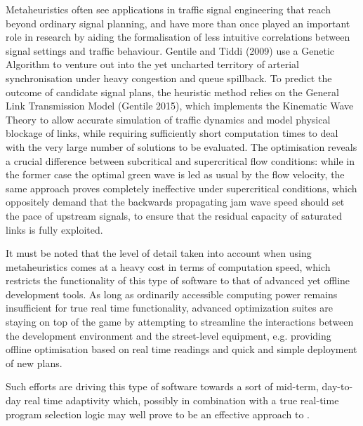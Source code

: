 Metaheuristics often see applications in traffic signal engineering that reach beyond ordinary signal planning, and have more than once played an important role in research by aiding the formalisation of less intuitive correlations between signal settings and traffic behaviour. Gentile and Tiddi (2009) use a Genetic Algorithm to venture out into the yet uncharted territory of arterial synchronisation under heavy congestion and queue spillback. To predict the outcome of candidate signal plans, the heuristic method relies on the General Link Transmission Model (Gentile 2015), which implements the Kinematic Wave Theory to allow accurate simulation of traffic dynamics and model physical blockage of links, while requiring sufficiently short computation times to deal with the very large number of solutions to be evaluated.
The optimisation reveals a crucial difference between subcritical and supercritical flow conditions: while in the former case the optimal green wave is led as usual by the flow velocity, the same approach proves completely ineffective under supercritical conditions, which oppositely demand that the backwards propagating jam wave speed should set the pace of upstream signals, to ensure that the residual capacity of saturated links is fully exploited.

It must be noted that the level of detail taken into account when using metaheuristics comes at a heavy cost in terms of computation speed, which restricts  the functionality of this type of software to that of advanced yet offline development tools. As long as ordinarily accessible computing power remains insufficient for true real time functionality, advanced optimization suites are staying on top of the game by attempting to streamline the interactions between the development environment and the street-level equipment, e.g. providing offline optimisation based on real time readings and quick and simple deployment of new plans.

Such efforts are driving this type of software towards a sort of mid-term, day-to-day real time adaptivity which, possibly in combination with a true real-time program selection logic may well prove to be an effective approach to .
